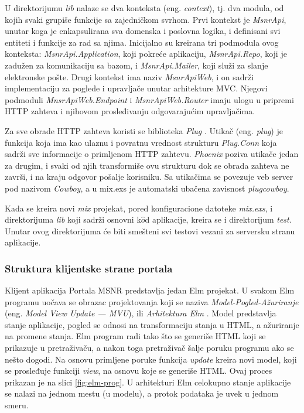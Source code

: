 \documentclass[12pt,oneside]{memoir}
\begin{document}
\par U direktorijumu \emph{lib} nalaze se dva konteksta (eng. \emph{context}), tj. dva modula, od kojih svaki grupiše funkcije sa zajedničkom svrhom. Prvi kontekst je \emph{MsnrApi}, unutar koga je enkapsulirana sva domenska i poslovna logika, i definisani svi entiteti i funkcije za rad sa njima. Inicijalno su kreirana tri podmodula ovog konteksta: \emph{MsnrApi.Application}, koji pokreće aplikaciju, \emph{MsnrApi.Repo}, koji je zadužen za komunikaciju sa bazom, i \emph{MsnrApi.Mailer}, koji služi za slanje elektronske pošte. Drugi kontekst ima naziv \emph{MsnrApiWeb}, i on sadrži implementaciju za poglede i upravljače unutar arhitekture MVC. Njegovi podmoduli \emph{MnsrApiWeb.Endpoint} i \emph{MsnrApiWeb.Router} imaju ulogu u pripremi HTTP zahteva i njihovom prosleđivanju odgovarajućim upravljačima. 
\par Za sve obrade HTTP zahteva koristi se biblioteka \emph{Plug} \cite{plug}. Utikač (eng. \emph{plug}) je funkcija koja ima kao ulaznu i povratnu vrednost strukturu \emph{Plug.Conn} koja sadrži sve informacije o primljenom HTTP zahtevu. \emph{Phoenix} poziva utikače jedan za drugim, i svaki od njih transformiše ovu strukturu dok se obrada zahteva ne završi, i na kraju odgovor pošalje korisniku. Sa utikačima se povezuje veb server pod nazivom \emph{Cowboy}, a u mix.exs je automatski ubačena zavisnost \emph{plug{\textunderscore}cowboy}.
\par Kada se kreira novi \emph{mix} projekat, pored konfiguracione datoteke \emph{mix.exs}, i direktorijuma \emph{lib} koji sadrži osnovni k$\hat{o}$d aplikacije, kreira se i direktorijum \emph{test}. Unutar ovog direktorijuma će biti smešteni svi testovi vezani za serversku stranu aplikacije. 

\subsubsection{Struktura klijentske strane portala}
\par Klijent aplikacija Portala MSNR predstavlja jedan Elm projekat. U svakom Elm programu uočava se obrazac projektovanja koji se naziva \emph{Model-Pogled-Ažuriranje} (eng. \emph{Model View Update --- MVU}), ili \emph{Arhitektura Elm} \cite{elm-in-action}. Model predstavlja stanje aplikacije, pogled se odnosi na transformaciju stanja u HTML, a ažuriranje na promene stanja. Elm program radi tako što se generiše HTML koji se prikazuje u pretraživaču, a nakon toga pretraživač šalje poruku programu ako se nešto dogodi. Na osnovu primljene poruke funkcija \emph{update} kreira novi model, koji se prosleđuje funkciji \emph{view}, na osnovu koje se generiše HTML. Ovaj proces prikazan je na slici \ref{fig:elm-prog}. U arhitekturi Elm celokupno stanje aplikacije se nalazi na jednom mestu (u modelu), a protok podataka je uvek u jednom smeru.
\end{document}
